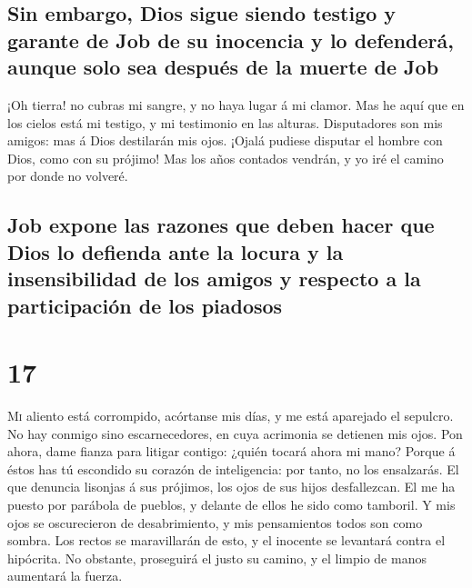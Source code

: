 \hypertarget{sin-embargo-dios-sigue-siendo-testigo-y-garante-de-job-de-su-inocencia-y-lo-defenderuxe1-aunque-solo-sea-despuuxe9s-de-la-muerte-de-job}{%
\subsection{Sin embargo, Dios sigue siendo testigo y garante de Job de
su inocencia y lo defenderá, aunque solo sea después de la muerte de
Job}\label{sin-embargo-dios-sigue-siendo-testigo-y-garante-de-job-de-su-inocencia-y-lo-defenderuxe1-aunque-solo-sea-despuuxe9s-de-la-muerte-de-job}}

 ¡Oh tierra! no cubras mi sangre, y no haya lugar á mi
clamor.  Mas he aquí que en los cielos está mi testigo, y
mi testimonio en las alturas.  Disputadores son mis
amigos: mas á Dios destilarán mis ojos.  ¡Ojalá pudiese
disputar el hombre con Dios, como con su prójimo!  Mas
los años contados vendrán, y yo iré el camino por donde no volveré.

\hypertarget{job-expone-las-razones-que-deben-hacer-que-dios-lo-defienda-ante-la-locura-y-la-insensibilidad-de-los-amigos-y-respecto-a-la-participaciuxf3n-de-los-piadosos}{%
\subsection{Job expone las razones que deben hacer que Dios lo defienda
ante la locura y la insensibilidad de los amigos y respecto a la
participación de los
piadosos}\label{job-expone-las-razones-que-deben-hacer-que-dios-lo-defienda-ante-la-locura-y-la-insensibilidad-de-los-amigos-y-respecto-a-la-participaciuxf3n-de-los-piadosos}}

\hypertarget{section-16}{%
\section{17}\label{section-16}}

 \textsc{Mi} aliento está corrompido, acórtanse mis días,
y me está aparejado el sepulcro.  No hay conmigo sino
escarnecedores, en cuya acrimonia se detienen mis ojos. 
Pon ahora, dame fianza para litigar contigo: ¿quién tocará ahora mi
mano?  Porque á éstos has tú escondido su corazón de
inteligencia: por tanto, no los ensalzarás.  El que
denuncia lisonjas á sus prójimos, los ojos de sus hijos desfallezcan.
 El me ha puesto por parábola de pueblos, y delante de
ellos he sido como tamboril.  Y mis ojos se oscurecieron
de desabrimiento, y mis pensamientos todos son como sombra.
 Los rectos se maravillarán de esto, y el inocente se
levantará contra el hipócrita.  No obstante, proseguirá el
justo su camino, y el limpio de manos aumentará la fuerza.

